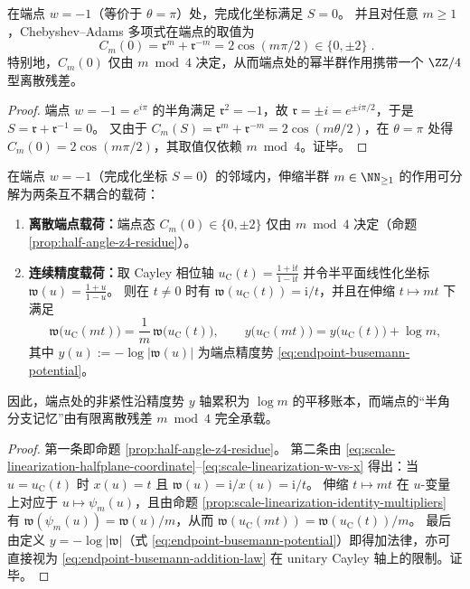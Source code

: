 \begin{proposition}[端点 \texorpdfstring{$w=-1$}{w=-1} 的半角残差与 \texorpdfstring{$\ZZ/4$}{Z/4} 型取值]\label{prop:half-angle-z4-residue}
在端点 \(w=-1\)（等价于 \(\theta=\pi\)）处，完成化坐标满足 \(S=0\)。
并且对任意 \(m\ge 1\)，Chebyshev--Adams 多项式在端点的取值为
\begin{equation}\label{eq:chebyshev-endpoint-values}
\boxed{\;
C_m(0)=\mathfrak{r}^{m}+\mathfrak{r}^{-m}=2\cos(m\pi/2)\in\{0,\pm 2\}\; }.
\end{equation}
特别地，\(C_m(0)\) 仅由 \(m\bmod 4\) 决定，从而端点处的幂半群作用携带一个 \(\ZZ/4\) 型离散残差。
\end{proposition}
\begin{proof}
端点 \(w=-1=e^{i\pi}\) 的半角满足 \(\mathfrak{r}^{2}=-1\)，故 \(\mathfrak{r}=\pm i=e^{\pm i\pi/2}\)，于是 \(S=\mathfrak{r}+\mathfrak{r}^{-1}=0\)。
又由于 \(C_m(S)=\mathfrak{r}^m+\mathfrak{r}^{-m}=2\cos(m\theta/2)\)，在 \(\theta=\pi\) 处得
\(
C_m(0)=2\cos(m\pi/2)
\)，其取值仅依赖 \(m\bmod 4\)。证毕。
\end{proof}

\begin{proposition}\label{prop:endpoint-orthogonal-decomposition-z4-Rplus}
在端点 \(w=-1\)（完成化坐标 \(S=0\)）的邻域内，伸缩半群 \(m\in\NN_{\ge 1}\) 的作用可分解为两条互不耦合的载荷：
\begin{enumerate}
  \item \textbf{离散端点载荷：}端点态 \(C_m(0)\in\{0,\pm 2\}\) 仅由 \(m\bmod 4\) 决定（命题 \ref{prop:half-angle-z4-residue}）。
  \item \textbf{连续精度载荷：}取 Cayley 相位轴 \(u_{\mathrm C}(t)=\frac{1+\mathrm{i}t}{1-\mathrm{i}t}\) 并令半平面线性化坐标 \(\mathfrak{w}(u)=\frac{1+u}{1-u}\)。
  则在 \(t\neq 0\) 时有 \(\mathfrak{w}(u_{\mathrm C}(t))=\mathrm{i}/t\)，并且在伸缩 \(t\mapsto mt\) 下满足
  \[
  \mathfrak{w}\!\bigl(u_{\mathrm C}(mt)\bigr)=\frac{1}{m}\,\mathfrak{w}\!\bigl(u_{\mathrm C}(t)\bigr),
  \qquad
  y\!\bigl(u_{\mathrm C}(mt)\bigr)=y\!\bigl(u_{\mathrm C}(t)\bigr)+\log m,
  \]
  其中 \(y(u):=-\log|\mathfrak{w}(u)|\) 为端点精度势 \eqref{eq:endpoint-busemann-potential}。
\end{enumerate}
因此，端点处的非紧性沿精度势 \(y\) 轴累积为 \(\log m\) 的平移账本，而端点的“半角分支记忆”由有限离散残差 \(m\bmod 4\) 完全承载。
\end{proposition}
\begin{proof}
第一条即命题 \ref{prop:half-angle-z4-residue}。
第二条由 \eqref{eq:scale-linearization-halfplane-coordinate}--\eqref{eq:scale-linearization-w-vs-x} 得出：当 \(u=u_{\mathrm C}(t)\) 时 \(x(u)=t\) 且 \(\mathfrak{w}(u)=\mathrm{i}/x(u)=\mathrm{i}/t\)。
伸缩 \(t\mapsto mt\) 在 \(u\)-变量上对应于 \(u\mapsto\psi_m(u)\)，且由命题 \ref{prop:scale-linearization-identity-multipliers} 有 \(\mathfrak{w}(\psi_m(u))=\mathfrak{w}(u)/m\)，从而 \(\mathfrak{w}(u_{\mathrm C}(mt))=\mathfrak{w}(u_{\mathrm C}(t))/m\)。
最后由定义 \(y=-\log|\mathfrak{w}|\)（式 \eqref{eq:endpoint-busemann-potential}）即得加法律，亦可直接视为 \eqref{eq:endpoint-busemann-addition-law} 在 unitary Cayley 轴上的限制。证毕。
\end{proof}

